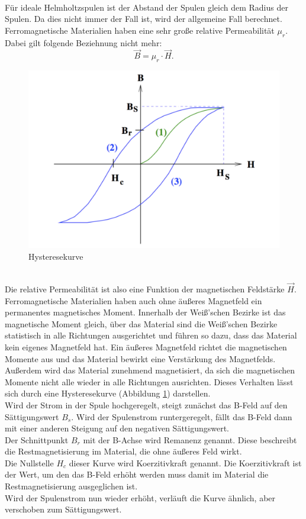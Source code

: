 \\Für ideale Helmholtzspulen ist der Abstand der Spulen gleich dem Radius der Spulen.
Da dies nicht immer der Fall ist, wird der allgemeine Fall berechnet.
\\Ferromagnetische Materialien haben eine sehr große relative Permeabilität $\mu_{r}$.
Dabei gilt folgende Beziehnung nicht mehr:
\begin{equation*}
    \vec{B}= \mu_{r} \cdot \vec{H}.
\end{equation*}
\begin{figure}
  \centering
  \includegraphics[width=\textwidth]{hys.pdf}
  \caption{Hysteresekurve \cite{1}}
  \label{fig:hys}
\end{figure}
\\Die relative Permeabilität ist also eine Funktion der magnetischen Feldstärke $\vec{H}$.
\\Ferromagnetische Materialien haben auch ohne äußeres Magnetfeld ein permanentes magnetisches Moment.
Innerhalb der Weiß'schen Bezirke ist das magnetische Moment gleich, über das Material sind die Weiß'schen Bezirke statistisch in alle Richtungen ausgerichtet und führen so dazu, dass das Material kein eigenes Magnetfeld hat.
Ein äußeres Magnetfeld richtet die magnetischen Momente aus und das Material bewirkt eine Verstärkung des Magnetfelds.
Außerdem wird das Material zunehmend magnetisiert, da sich die magnetischen Momente nicht alle wieder in alle Richtungen ausrichten.
Dieses Verhalten lässt sich durch eine Hysteresekurve (Abbildung \ref{fig:hys}) darstellen.
\\Wird der Strom in der Spule hochgeregelt, steigt zunächst das B-Feld auf den Sättigungswert $B_{s}$.
Wird der Spulenstrom runtergeregelt, fällt das B-Feld dann mit einer anderen Steigung auf den negativen Sättigungswert.
\\Der Schnittpunkt $B_{r}$ mit der B-Achse wird Remanenz genannt. Diese beschreibt die Restmagnetisierung im Material, die ohne äußeres Feld wirkt.
\\Die Nullstelle $H_{c}$ dieser Kurve wird Koerzitivkraft genannt. Die Koerzitivkraft ist der Wert, um den das B-Feld erhöht werden muss damit im Material die Restmagnetisierung ausgeglichen ist.
\\Wird der Spulenstrom nun wieder erhöht, verläuft die Kurve ähnlich, aber verschoben zum Sättigungswert.
